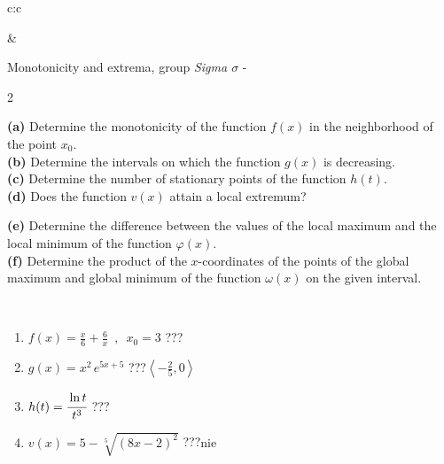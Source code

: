 \documentclass[10pt]{report}
\begin{document}
\begin{tabular}{c:c}
\begin{minipage}[c][104.5mm][t]{0.5\linewidth}
\begin{center}
\end{center}
\end{minipage}
&
\begin{minipage}[c][104.5mm][t]{0.5\linewidth}
\begin{center}
\vspace{5mm}
{\huge Monotonicity and extrema, group \textit{Sigma $\sigma$} -}\\[5mm]
\begin{minipage}{0.95\linewidth}
\begin{center}
{\small \begin{multicols}{2} \raggedright
\textbf{(a)} Determine the monotonicity of the function \(f(x)\) in the neighborhood of the point \(x_0\). \\[1mm]
\textbf{(b)} Determine the intervals on which the function \(g(x)\) is decreasing. \\[1mm]
\textbf{(c)} Determine the number of stationary points of the function \(h(t)\). \\[1mm]
\textbf{(d)} Does the function \(v(x)\) attain a local extremum? \par \columnbreak
\textbf{(e)} Determine the difference between the values of the local maximum and the local minimum of the function \(\varphi(x)\). \\[1mm]
\textbf{(f)} Determine the product of the \(x\)-coordinates of the points of the global maximum and global minimum of the function \(\omega(x)\) on the given interval. \\[1mm]
\end{multicols}
}
\end{center}
\end{minipage}
\\[1mm]
\begin{minipage}{0.79\linewidth}
\begin{center}
\begin{varwidth}{\linewidth}
\setlength{\itemsep}{0pt}
\begin{enumerate}
\normalsize
\item $f(x)=\frac{x}{6}+\frac{6}{x} \enspace , \enspace x_0=3$\quad \dotfill\; ???\;\dotfill \quad {}
\item $g(x)=x^2\, e^{5x+5}$\quad \dotfill\; ???\;\dotfill \quad $\left\langle-\frac{2}{5} , 0\right\rangle$
\item $h(t)=\cfrac{\ln t}{t^3}$\quad \dotfill\; ???\;\dotfill {}
\item $v(x)=5-\sqrt[5]{(8x-2)^2}$\quad \dotfill\; ???\;\dotfill \quad $\text{nie}$

\end{enumerate}
\end{varwidth}
\end{center}
\end{minipage}
\end{center}
\end{minipage}
\end{tabular}
\end{document}
